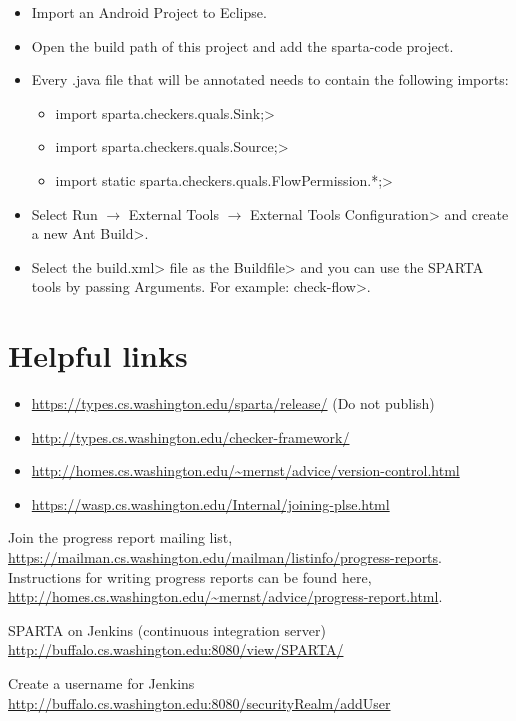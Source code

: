 \begin{itemize}
\item Import an Android Project to Eclipse. 
\item Open the build path of this project and add the sparta-code project.
\item Every .java file that will be annotated needs to contain the 
following imports:
  \begin{itemize}
    \item \<import  sparta.checkers.quals.Sink;>
    \item \<import  sparta.checkers.quals.Source;>
    \item \<import static sparta.checkers.quals.FlowPermission.*;>
  \end{itemize}
\item Select \<Run $\rightarrow$ External Tools $\rightarrow$ External Tools Configuration> 
and create a new \<Ant Build>.
\item Select the \<build.xml> file as the \<Buildfile> and you can use the SPARTA tools by passing
Arguments. For example: \<check-flow>.
\end{itemize}


\section{Helpful links\label{dev-links}}

\begin{itemize}
\item \url{https://types.cs.washington.edu/sparta/release/} (Do not publish)
\item \url{http://types.cs.washington.edu/checker-framework/  }

\item \url{http://homes.cs.washington.edu/~mernst/advice/version-control.html}
\item \url{https://wasp.cs.washington.edu/Internal/joining-plse.html}
\end{itemize}

Join the progress report mailing list, \url{https://mailman.cs.washington.edu/mailman/listinfo/progress-reports}.
 Instructions for writing progress reports can be found here, \url{http://homes.cs.washington.edu/~mernst/advice/progress-report.html}.

SPARTA on Jenkins (continuous integration server) \url{http://buffalo.cs.washington.edu:8080/view/SPARTA/}

Create a username for Jenkins \url{http://buffalo.cs.washington.edu:8080/securityRealm/addUser}

